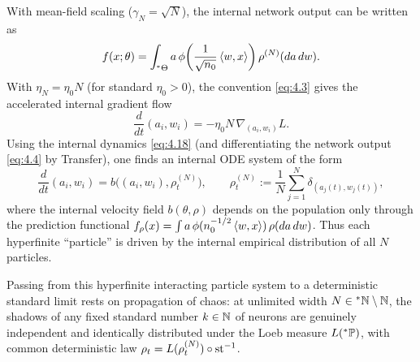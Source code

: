 With mean-field scaling ($\gamma_N = \sqrt{N}$), the internal network output can be written as
\begin{equation}\label{eq:4.17}
f(x; \theta) = \int_{{}^*\Theta} a\,\phi\!\left(\frac{1}{\sqrt{n_0}}\left\langle w, x \right\rangle\right) \rho^{(N)}(da\,dw).
\end{equation}
With $\eta_N = \eta_0 N$ (for standard $\eta_0 > 0$), the convention \eqref{eq:4.3} gives the accelerated internal gradient flow
\begin{equation}\label{eq:4.18}
\frac{d}{dt}(a_i, w_i) = -\eta_0 N\,\nabla_{(a_i, w_i)} L.
\end{equation}
Using the internal dynamics \eqref{eq:4.18} (and differentiating the network output \eqref{eq:4.4} by Transfer), one finds an internal ODE system of the form
\begin{equation}\label{eq:4.19}
\frac{d}{dt}(a_i, w_i) = b\bigl((a_i, w_i), \rho_t^{(N)}\bigr), \qquad \rho_t^{(N)} := \frac{1}{N}\sum_{j=1}^N \delta_{(a_j(t), w_j(t))},
\end{equation}
where the internal velocity field $b(\theta, \rho)$ depends on the population only through the prediction functional $f_\rho(x) = \int a\,\phi(n_0^{-1/2}\left\langle w, x \right\rangle)\,\rho(da\,dw)$. Thus each hyperfinite ``particle'' is driven by the internal empirical distribution of all $N$ particles.

Passing from this hyperfinite interacting particle system to a deterministic standard limit rests on propagation of chaos: at unlimited width $N \in {}^*\mathbb{N} \setminus \mathbb{N}$, the shadows of any fixed standard number $k \in \mathbb{N}$ of neurons are genuinely independent and identically distributed under the Loeb measure $L({}^*\mathbb{P})$, with common deterministic law $\rho_t = L(\rho_t^{(N)}) \circ \operatorname{st}^{-1}$.

